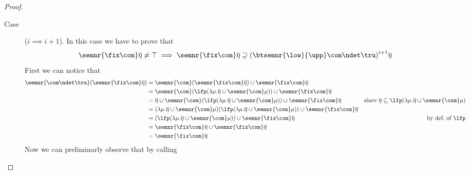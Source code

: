 \begin{proof}
\begin{inductive}
\begin{description}
    \item[Case] (\(i \implies i+1\)). In this case we have to prove
      that
      \begin{equation*}
        \semnr{\fix\com}\overline\eta \neq \top
        \implies
        \semnr{\fix\com}\overline\eta \supseteq {\left(\btsemnr{\low}{\upp}\com\ndet\tru\right)}^{i+1}\overline\eta
      \end{equation*}
      First we can notice that
      \begin{align*}
        \semnr{\com\ndet\tru}(\semnr{\fix\com}\overline\eta) & = \semnr{\com}(\semnr{\fix\com}\overline\eta) \cup \semnr{\fix\com}\overline\eta \\
                                                    & = \semnr{\com}(\lfp(\lambda \mu . \overline\eta \cup \semnr{\com}\mu)) \cup \semnr{\fix\com}\overline\eta \\
                                                    & = \overline\eta \cup \semnr{\com}(\lfp(\lambda \mu . \overline\eta \cup \semnr{\com}\mu)) \cup \semnr{\fix\com}\overline\eta & \text{since } \overline\eta \subseteq \lfp(\lambda \mu . \overline\eta \cup \semnr{\com}\mu)\\
                                                    & = (\lambda \mu . \overline\eta \cup \semnr{\com}\mu)(\lfp(\lambda \mu . \overline\eta \cup \semnr{\com}\mu)) \cup \semnr{\fix\com}\overline\eta \\
                                                    & = (\lfp(\lambda \mu . \overline\eta \cup \semnr{\com}\mu)) \cup \semnr{\fix\com}\overline\eta & \text{by def.\ of } \lfp\\
                                                    & = \semnr{\fix\com}\overline\eta \cup \semnr{\fix\com}\overline\eta \\
                                                    & = \semnr{\fix\com}\overline\eta
      \end{align*}
      Now we can preliminarly observe that by calling

\end{description}
\end{inductive}
\end{proof}
